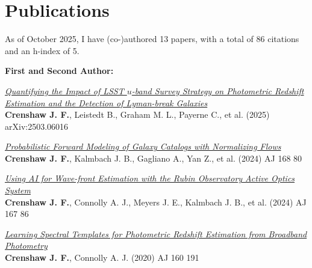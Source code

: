 \section{Publications}

As of October 2025, I have (co-)authored 13 papers, with a total of 86 citations and an h-index of 5. \vspace{2mm}

\textbf{First and Second Author:}
\begin{etaremune}
\item \href{https://ui.adsabs.harvard.edu/abs/2025arXiv250306016C}{\textit{Quantifying the Impact of LSST $u$-band Survey Strategy on Photometric Redshift Estimation and the Detection of Lyman-break Galaxies}} \\ 
\textbf{Crenshaw J. F.}, Leistedt B., Graham M. L., Payerne C., et al. (2025) 
arXiv:2503.06016 

\item \href{https://ui.adsabs.harvard.edu/abs/2024AJ....168...80C}{\textit{Probabilistic Forward Modeling of Galaxy Catalogs with Normalizing Flows}} \\ 
\textbf{Crenshaw J. F.}, Kalmbach J. B., Gagliano A., Yan Z., et al. (2024) 
AJ 168 80 

\item \href{https://ui.adsabs.harvard.edu/abs/2024AJ....167...86C}{\textit{Using AI for Wave-front Estimation with the Rubin Observatory Active Optics System}} \\ 
\textbf{Crenshaw J. F.}, Connolly A. J., Meyers J. E., Kalmbach J. B., et al. (2024) 
AJ 167 86 

\item \href{https://ui.adsabs.harvard.edu/abs/2020AJ....160..191C}{\textit{Learning Spectral Templates for Photometric Redshift Estimation from Broadband Photometry}} \\ 
\textbf{Crenshaw J. F.}, Connolly A. J. (2020) 
AJ 160 191 

\end{etaremune}

